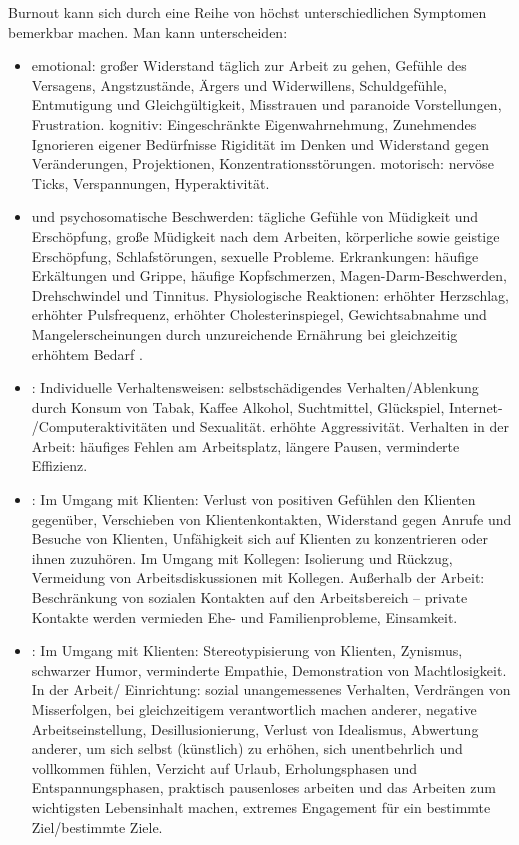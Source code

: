 \TextSlide{\TxSymptome}
{Burnout kann sich durch eine Reihe von höchst unterschiedlichen Symptomen bemerkbar machen. 
Man kann unterscheiden:

\begin{itemize}
  \item {}
  emotional: großer Widerstand täglich zur Arbeit zu gehen,
  Gefühle des Versagens, Angstzustände, Ärgers und Widerwillens,
  Schuldgefühle, Entmutigung und Gleichgültigkeit, Misstrauen
  und paranoide Vorstellungen, Frustration. kognitiv:
  Eingeschränkte Eigenwahrnehmung, Zunehmendes Ignorieren
  eigener Bedürfnisse
  Rigidität im Denken und Widerstand gegen Veränderungen,
  Projektionen, Konzentrationsstörungen. motorisch: nervöse
  Ticks, Verspannungen, Hyperaktivität.
  \item {} und
  psychosomatische Beschwerden: tägliche Gefühle von Müdigkeit
  und Erschöpfung, große Müdigkeit nach dem Arbeiten, körperliche sowie geistige Erschöpfung,
  Schlafstörungen, sexuelle Probleme. Erkrankungen: häufige
  Erkältungen und Grippe, häufige Kopfschmerzen,
  Magen-Darm-Beschwerden, Drehschwindel und Tinnitus. Physiologische Reaktionen: erhöhter
  Herzschlag, erhöhter Pulsfrequenz, erhöhter Cholesterinspiegel, Gewichtsabnahme und
    Mangelerscheinungen durch unzureichende Ernährung bei
    gleichzeitig erhöhtem Bedarf
.
  \item {}:
  Individuelle Verhaltensweisen: 
  selbstschädigendes Verhalten/Ablenkung durch Konsum von Tabak, Kaffee 
    Alkohol, Suchtmittel, Glückspiel, Internet-
    /Computeraktivitäten und Sexualität. erhöhte
  Aggressivität. Verhalten in der Arbeit: häufiges Fehlen am
  Arbeitsplatz, längere Pausen, verminderte Effizienz.
  \item {}:
  Im Umgang mit Klienten: Verlust von positiven Gefühlen den
  Klienten gegenüber, Verschieben von Klientenkontakten,
  Widerstand gegen Anrufe und Besuche von Klienten,
  Unfähigkeit sich auf Klienten zu konzentrieren oder ihnen
  zuzuhören. Im Umgang mit Kollegen: Isolierung und Rückzug,
  Vermeidung von Arbeitsdiskussionen mit Kollegen. Außerhalb
  der Arbeit: Beschränkung von sozialen Kontakten auf den
  Arbeitsbereich – private Kontakte werden vermieden Ehe-
  und Familienprobleme, Einsamkeit.
  
  \item {}:
  Im Umgang mit Klienten: Stereotypisierung von Klienten,
  Zynismus, schwarzer Humor, verminderte Empathie,
  Demonstration von Machtlosigkeit. In der Arbeit/
  Einrichtung: sozial unangemessenes Verhalten, Verdrängen
  von Misserfolgen, bei gleichzeitigem verantwortlich machen
  anderer, negative Arbeitseinstellung, Desillusionierung,
  Verlust von Idealismus, Abwertung anderer, um sich selbst
  (künstlich) zu erhöhen, sich unentbehrlich und vollkommen
  fühlen, Verzicht auf Urlaub, Erholungsphasen und
  Entspannungsphasen, praktisch pausenloses arbeiten und das
  Arbeiten zum wichtigsten Lebensinhalt machen, extremes
  Engagement für ein bestimmte Ziel/bestimmte Ziele.
\end{itemize}

     
}

